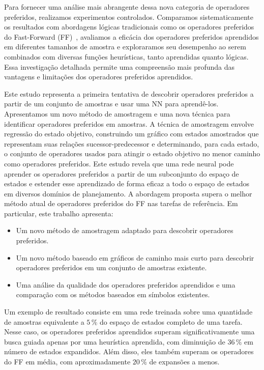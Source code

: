 \documentclass[ppgc,diss,english]{iiufrgs}
\begin{document}

Para fornecer uma análise mais abrangente dessa nova categoria de operadores preferidos, realizamos experimentos controlados. Comparamos sistematicamente os resultados com abordagens lógicas tradicionais como os operadores preferidos do Fast-Forward (FF)~\cite{Hoffmann.Nebel/2001, Helmert/2006}, avaliamos a eficácia dos operadores preferidos aprendidos em diferentes tamanhos de amostra e exploraramos seu desempenho ao serem combinados com diversas funções heurísticas, tanto aprendidas quanto lógicas. Essa investigação detalhada permite uma compreensão mais profunda das vantagens e limitações dos operadores preferidos aprendidos.

Este estudo representa a primeira tentativa de descobrir operadores preferidos a partir de um conjunto de amostras e usar uma NN para aprendê-los. Apresentamos um novo método de amostragem e uma nova técnica para identificar operadores preferidos em amostras. A técnica de amostragem envolve regressão do estado objetivo, construindo um gráfico com estados amostrados que representam suas relações sucessor-predecessor e determinando, para cada estado, o conjunto de operadores usados para atingir o estado objetivo no menor caminho como operadores preferidos. Este estudo revela que uma rede neural pode aprender os operadores preferidos a partir de um subconjunto do espaço de estados e estender esse aprendizado de forma eficaz a todo o espaço de estados em diversos domínios de planejamento. A abordagem proposta supera o melhor método atual de operadores preferidos do FF nas tarefas de referência. Em particular, este trabalho apresenta:

\begin{itemize}
\item Um novo método de amostragem adaptado para descobrir operadores preferidos.
\item Um novo método baseado em gráficos de caminho mais curto para descobrir operadores preferidos em um conjunto de amostras existente.
\item Uma análise da qualidade dos operadores preferidos aprendidos e uma comparação com os métodos baseados em símbolos existentes.
\end{itemize}

Um exemplo de resultado consiste em uma rede treinada sobre uma quantidade de amostras equivalente a $5\,\%$ do espaço de estados completo de uma tarefa. Nesse caso, os operadores preferidos aprendidos superam significativamente uma busca guiada apenas por uma heurística aprendida, com diminuição de $36\,\%$ em número de estados expandidos. Além disso, eles também superam os operadores do FF em média, com aproximadamente $20\,\%$ de expansões a menos.
\end{document}
